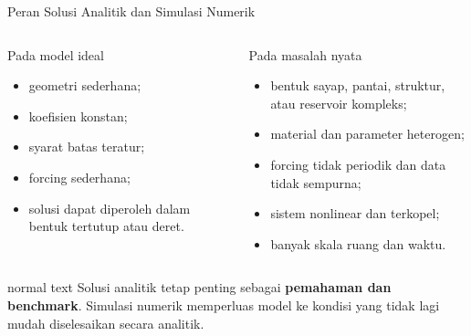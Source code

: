\documentclass[aspectratio=169,10pt]{beamer}
\begin{document}
\begin{frame}{Peran Solusi Analitik dan Simulasi Numerik}
\begin{columns}[T,onlytextwidth]
\begin{block}{Pada model ideal}
\begin{itemize}
  \item geometri sederhana;
  \item koefisien konstan;
  \item syarat batas teratur;
  \item forcing sederhana;
  \item solusi dapat diperoleh dalam bentuk tertutup atau deret.
\end{itemize}
\end{block}
\begin{block}{Pada masalah nyata}
\begin{itemize}
  \item bentuk sayap, pantai, struktur, atau reservoir kompleks;
  \item material dan parameter heterogen;
  \item forcing tidak periodik dan data tidak sempurna;
  \item sistem nonlinear dan terkopel;
  \item banyak skala ruang dan waktu.
\end{itemize}
\end{block}
\end{columns}
\vspace{0.14cm}
\begin{beamercolorbox}[sep=.10cm,wd=\textwidth]{normal text}
\centering\small
Solusi analitik tetap penting sebagai \textbf{pemahaman dan benchmark}. Simulasi numerik memperluas model ke kondisi yang tidak lagi mudah diselesaikan secara analitik.
\end{beamercolorbox}
\end{frame}
\end{document}
